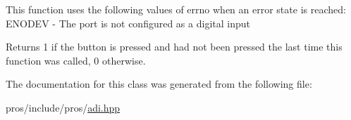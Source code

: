 This function uses the following values of errno when an error state is reached\+: E\+N\+O\+D\+EV -\/ The port is not configured as a digital input

\begin{DoxyReturn}{Returns}
1 if the button is pressed and had not been pressed the last time this function was called, 0 otherwise. 
\end{DoxyReturn}


The documentation for this class was generated from the following file\+:\begin{DoxyCompactItemize}
\item 
pros/include/pros/\hyperlink{adi_8hpp}{adi.\+hpp}\end{DoxyCompactItemize}
